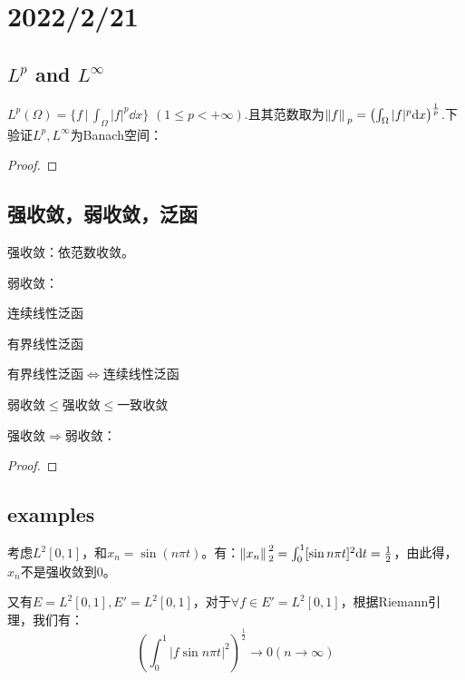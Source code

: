 \section{2022/2/21}

\subsection{$L^p$ and $L^{\infty}$}

$L^p(\Omega)=\{f\,\big|\, \int_{\Omega}|f|^p\dd x\}\,\,(1\leq p<+\infty)$.且其范数取为$\norm*{f}_{p}=\left(\int_{\Omega}|f|^p\dd x\right)^{\frac{1}{p}}$.下验证$L^p,L^{\infty}$为Banach空间：
\begin{proof}
    
\end{proof}

\subsection{强收敛，弱收敛，泛函}

强收敛：依范数收敛。\par
弱收敛：\par
连续线性泛函\par
有界线性泛函\par
有界线性泛函$\Leftrightarrow$连续线性泛函\par
弱收敛$\leq $强收敛$\leq $一致收敛
\par
强收敛$\Rightarrow $弱收敛：
\begin{proof}
    
\end{proof}

\subsection{examples}

\begin{example}[弱收敛但是不强收敛的例子]
    考虑$L^2[0,1]$，和$x_n=\sin(n\pi t)$。有：$\norm*{x_n}_2^2=\int_0^1[\sin n\pi t]^2\dd t=\frac{1}{2}$，由此得，$x_n$不是强收敛到0。\par
    又有$E=L^2[0,1],E'=L^2[0,1]$，对于$\forall f\in E'=L^2[0,1]$，根据Riemann引理，我们有：
    \begin{equation*}
        \left(\int_0^1|f\sin n\pi t|^2\right)^{\frac{1}{2}}\rightarrow 0(n\rightarrow\infty )
    \end{equation*}
\end{example}


